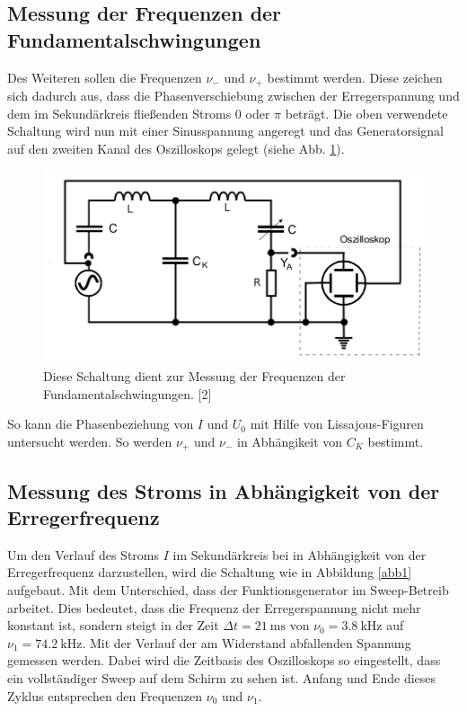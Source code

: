 \documentclass[11pt,ngerman,a4paper]{article}
\begin{document}
\subsection{Messung der Frequenzen der Fundamentalschwingungen}
Des Weiteren sollen die Frequenzen $\nu_-$ und $\nu_+$ bestimmt werden. Diese zeichen sich dadurch aus, dass die Phasenverschiebung zwischen der Erregerspannung und dem im Sekundärkreis fließenden Stroms $0$ oder $\pi$ beträgt. Die oben verwendete Schaltung wird nun mit einer Sinusspannung angeregt und das Generatorsignal auf den zweiten Kanal des Oszilloskops gelegt (siehe Abb. \ref{abb3}).
\begin{figure}[h!]
\centering
\includegraphics[scale=0.5]{Abb/abb3.png}
\caption{Diese Schaltung dient  zur Messung der Frequenzen der Fundamentalschwingungen. [2]}
\label{abb3}
\end{figure}
So kann die Phasenbeziehung von $I$ und $U_0$ mit Hilfe von Lissajous-Figuren untersucht werden. So werden $\nu_+$ und $\nu_-$ in Abhängikeit von $C_K$ bestimmt.
\subsection{Messung des Stroms in Abhängigkeit von der Erregerfrequenz}

Um den Verlauf des Stroms $I$ im Sekundärkreis bei in Abhängigkeit von der Erregerfrequenz darzustellen, wird die Schaltung wie in Abbildung \ref{abb1} aufgebaut. Mit dem Unterschied, dass der Funktionsgenerator im Sweep-Betreib arbeitet. Dies bedeutet, dass die Frequenz der Erregerspannung nicht mehr konstant ist, sondern steigt in der Zeit $\Delta t =\SI{21}{\milli\second}$ von $\nu_0 = \SI{3,8}{\kilo\hertz}$ auf $\nu_1 = \SI{74,2}{\kilo\hertz}$. Mit der Verlauf der am Widerstand abfallenden Spannung gemessen werden. Dabei wird die Zeitbasis des Oszilloskops so eingestellt, dass ein vollständiger Sweep auf dem Schirm zu sehen ist. Anfang und Ende dieses Zyklus entsprechen den Frequenzen $\nu_0$ und $\nu_1$.     
\end{document}
